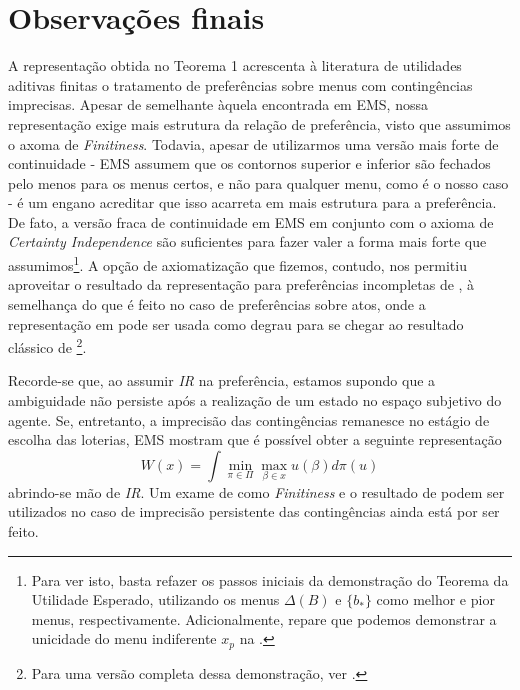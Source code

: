 \documentclass[12pt, a4paper]{article}
\theoremstyle{nonumberplain}
\theoremstyle{plain}
\theoremstyle{plain}
\theoremstyle{plain}
\theoremstyle{nonumberplain}
\begin{document}
\section{Observações finais}
A representação obtida no Teorema 1 acrescenta à literatura de utilidades aditivas finitas o tratamento de preferências sobre menus com contingências imprecisas. Apesar de semelhante àquela encontrada em EMS, nossa representação exige mais estrutura da relação de preferência, visto que assumimos o axoma de \emph{Finitiness}. Todavia, apesar de utilizarmos uma versão mais forte de continuidade - EMS assumem que os contornos superior e inferior são fechados pelo menos para os menus certos, e não para qualquer menu, como é o nosso caso - é um engano acreditar que isso acarreta em mais estrutura para a preferência. De fato, a versão fraca de continuidade em EMS em conjunto com o axioma de \emph{Certainty Independence} são suficientes para fazer valer a forma mais forte que assumimos\footnote{Para ver isto, basta refazer os passos iniciais da demonstração do Teorema da Utilidade Esperado, utilizando os menus $\Delta(B)$ e $\{b_*\}$ como melhor e pior menus, respectivamente. Adicionalmente, repare que podemos demonstrar a unicidade do menu indiferente $x_p$ na .}. A opção de axiomatização que fizemos, contudo, nos permitiu aproveitar o resultado da representação para preferências incompletas de \cite{Kochov2007}, à semelhança do que é feito no caso de preferências sobre atos, onde a representação em \cite{Bewley1986a} pode ser usada como degrau para se chegar ao resultado clássico de \cite{Gilboa1989}\footnote{Para uma versão completa dessa demonstração, ver \cite{Riella2014}.}.

Recorde-se que, ao assumir \emph{IR} na preferência, estamos supondo que a ambiguidade não persiste após a realização de um estado no espaço subjetivo do agente. Se, entretanto, a imprecisão das contingências remanesce no estágio de escolha das loterias, EMS mostram que é possível obter a seguinte representação
$$W(x)=\int \min_{\pi\in\Pi} \max_{\beta\in x}u(\beta)d\pi(u) $$
abrindo-se mão de \emph{IR}. Um exame de como \emph{Finitiness} e o resultado de \cite{Kochov2007} podem ser utilizados no caso de imprecisão persistente das contingências ainda está por ser feito.
\clearpage



\end{document}
